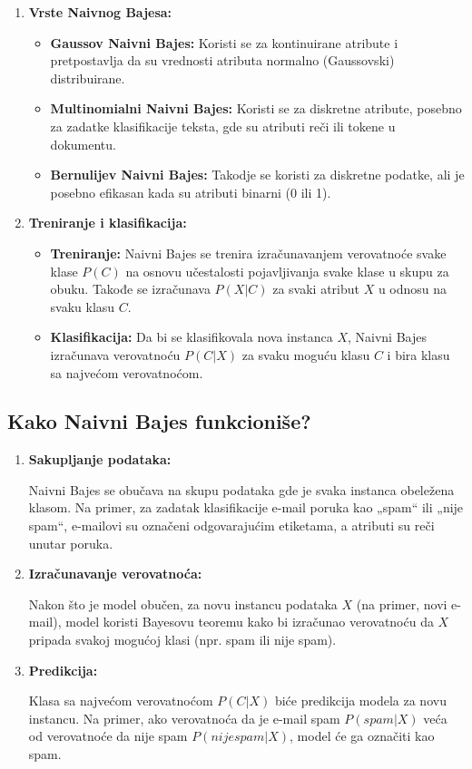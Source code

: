\documentclass{article}
\begin{document}
\begin{enumerate}
\item \textbf{Vrste Naivnog Bajesa:} 
    \begin{itemize}
        \item \textbf{Gaussov Naivni Bajes:} Koristi se za kontinuirane atribute i pretpostavlja da su vrednosti atributa normalno (Gaussovski) distribuirane.
        \item \textbf{Multinomialni Naivni Bajes:} Koristi se za diskretne atribute, posebno za zadatke klasifikacije teksta, gde su atributi reči ili tokene u dokumentu.
        \item \textbf{Bernulijev Naivni Bajes:} Takodje se koristi za diskretne podatke, ali je posebno efikasan kada su atributi binarni (0 ili 1).
    \end{itemize}
\newpage
\item \textbf{Treniranje i klasifikacija:}
    \begin{itemize}
        \item \textbf{Treniranje:} Naivni Bajes se trenira izračunavanjem verovatnoće svake klase $P(C)$ na osnovu učestalosti pojavljivanja svake klase u skupu za obuku. Takođe se izračunava $P(X|C)$ za svaki atribut $X$ u odnosu na svaku klasu $C$.
        \item \textbf{Klasifikacija:} Da bi se klasifikovala nova instanca $X$, Naivni Bajes izračunava verovatnoću $P(C|X)$ za svaku moguću klasu $C$ i bira klasu sa najvećom verovatnoćom.
    \end{itemize}
\end{enumerate}
\subsection{Kako Naivni Bajes funkcioniše?}
\begin{enumerate}

    \item \textbf{Sakupljanje podataka:}

Naivni Bajes se obučava na skupu podataka gde je svaka instanca obeležena klasom. Na primer, za zadatak klasifikacije e-mail poruka kao „spam“ ili „nije spam“, e-mailovi su označeni odgovarajućim etiketama, a atributi su reči unutar poruka.
 \item \textbf{Izračunavanje verovatnoća:}

Nakon što je model obučen, za novu instancu podataka $X$ (na primer, novi e-mail), model koristi Bayesovu teoremu kako bi izračunao verovatnoću da $X$ pripada svakoj mogućoj klasi (npr. spam ili nije spam).
\item \textbf{Predikcija:}

Klasa sa najvećom verovatnoćom $P(C|X)$ biće predikcija modela za novu instancu. Na primer, ako verovatnoća da je e-mail spam $P(spam|X)$ veća od verovatnoće da nije spam $P(nije spam|X)$, model će ga označiti kao spam.
\end{enumerate}
\end{document}
